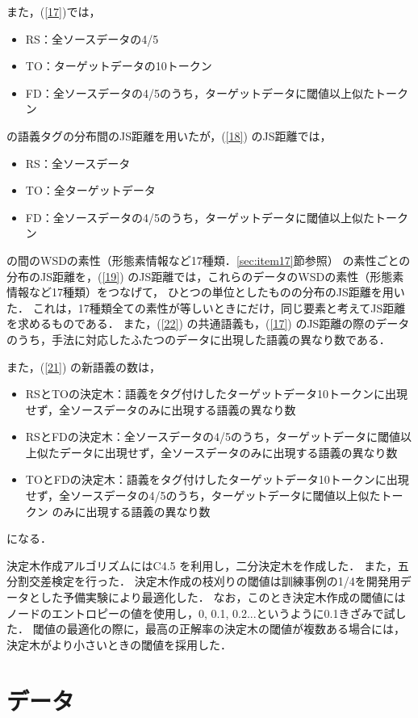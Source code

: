 \documentclass[japanese]{jnlp_1.4}
\begin{document}
また，(\ref{17})では，
\begin{itemize}
\item RS：全ソースデータの4/5
\item TO：ターゲットデータの10トークン
\item FD：全ソースデータの4/5のうち，ターゲットデータに閾値以上似たトークン
\end{itemize}
の語義タグの分布間のJS距離を用いたが，(\ref{18}) のJS距離では，
\begin{itemize}
\item RS：全ソースデータ
\item TO：全ターゲットデータ
\item FD：全ソースデータの4/5のうち，ターゲットデータに閾値以上似たトークン
\end{itemize}
の間のWSDの素性（形態素情報など17種類．\ref{sec:item17}節参照）
の素性ごとの分布のJS距離を，(\ref{19}) のJS距離では，これらのデータのWSDの素性（形態素情報など17種類）をつなげて，
ひとつの単位としたものの分布のJS距離を用いた．
これは，17種類全ての素性が等しいときにだけ，同じ要素と考えてJS距離を求めるものである．
また，(\ref{22}) の共通語義も，(\ref{17}) のJS距離の際のデータのうち，手法に対応したふたつのデータに出現した語義の異なり数である．

また，(\ref{21}) の新語義の数は，
\begin{itemize}
\item RSとTOの決定木：語義をタグ付けしたターゲットデータ10トークンに出現せず，全ソースデータのみに出現する語義の異なり数
\item RSとFDの決定木：全ソースデータの4/5のうち，ターゲットデータに閾値以上似たデータに出現せず，全ソースデータのみに出現する語義の異なり数
\item TOとFDの決定木：語義をタグ付けしたターゲットデータ10トークンに出現せず，全ソースデータの4/5のうち，ターゲットデータに閾値以上似たトークン
のみに出現する語義の異なり数
\end{itemize}
になる．


決定木作成アルゴリズムにはC4.5 \cite{book2}を利用し，二分決定木を作成した．
また，五分割交差検定を行った．
決定木作成の枝刈りの閾値は訓練事例の1/4を開発用データとした予備実験により最適化した．
なお，このとき決定木作成の閾値にはノードのエントロピーの値を使用し，0, 0.1, 0.2...というように0.1きざみで試した．
閾値の最適化の際に，最高の正解率の決定木の閾値が複数ある場合には，決定木がより小さいときの閾値を採用した．



\section{データ} \label{Sec:データ}
\end{document}
